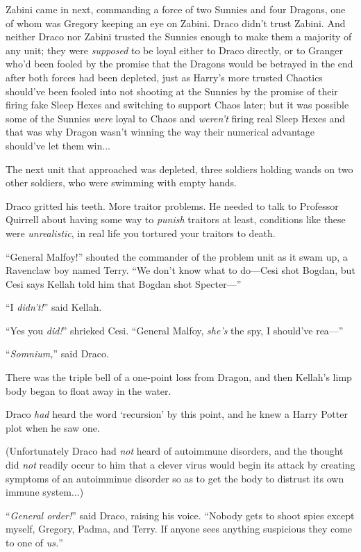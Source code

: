Zabini came in next, commanding a force of two Sunnies and four Dragons, one of whom was Gregory keeping an eye on Zabini. Draco didn’t trust Zabini. And neither Draco nor Zabini trusted the Sunnies enough to make them a majority of any unit; they were \emph{supposed} to be loyal either to Draco directly, or to Granger who’d been fooled by the promise that the Dragons would be betrayed in the end after both forces had been depleted, just as Harry’s more trusted Chaotics should’ve been fooled into not shooting at the Sunnies by the promise of their firing fake Sleep Hexes and switching to support Chaos later; but it was possible some of the Sunnies \emph{were} loyal to Chaos and \emph{weren’t} firing real Sleep Hexes and that was why Dragon wasn’t winning the way their numerical advantage should’ve let them win...

The next unit that approached was depleted, three soldiers holding wands on two other soldiers, who were swimming with empty hands.

Draco gritted his teeth. More traitor problems. He needed to talk to Professor Quirrell about having some way to \emph{punish} traitors at least, conditions like these were \emph{unrealistic}, in real life you tortured your traitors to death.

“General Malfoy!” shouted the commander of the problem unit as it swam up, a Ravenclaw boy named Terry. “We don’t know what to do—Cesi shot Bogdan, but Cesi says Kellah told him that Bogdan shot Specter—”

“I \emph{didn’t!}” said Kellah.

“Yes you \emph{did!}” shrieked Cesi. “General Malfoy, \emph{she’s} the spy, I should’ve rea—”

“\emph{Somnium,}” said Draco.

There was the triple bell of a one-point loss from Dragon, and then Kellah’s limp body began to float away in the water.

Draco \emph{had} heard the word ‘recursion’ by this point, and he knew a Harry Potter plot when he saw one.

(Unfortunately Draco had \emph{not} heard of autoimmune disorders, and the thought did \emph{not} readily occur to him that a clever virus would begin its attack by creating symptoms of an autoimminue disorder so as to get the body to distrust its own immune system...)

“\emph{General order!}” said Draco, raising his voice. “Nobody gets to shoot spies except myself, Gregory, Padma, and Terry. If anyone sees anything suspicious they come to one of \emph{us.}”

